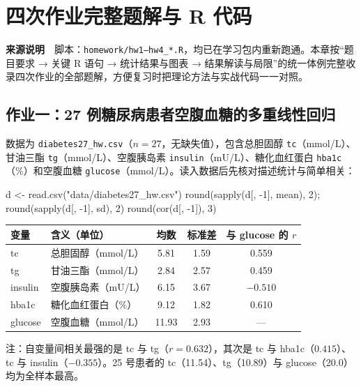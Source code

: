 \chapter{四次作业完整题解与 R 代码}

\begin{studysource}
\textbf{来源说明}　脚本：\texttt{homework/hw1–hw4\_*.R}，均已在学习包内重新跑通。本章按“题目要求 → 关键 R 语句 → 统计结果与图表 → 结果解读与局限”的统一体例完整收录四次作业的全部题解，方便复习时把理论方法与实战代码一一对照。
\end{studysource}


\section{作业一：27 例糖尿病患者空腹血糖的多重线性回归}

数据为 \texttt{diabetes27\_hw.csv}（$n=27$，无缺失值），包含总胆固醇 \texttt{tc}（mmol/L）、甘油三酯 \texttt{tg}（mmol/L）、空腹胰岛素 \texttt{insulin}（mU/L）、糖化血红蛋白 \texttt{hba1c}（\%）和空腹血糖 \texttt{glucose}（mmol/L）。读入数据后先核对描述统计与简单相关：

\begin{rcode}
d <- read.csv("data/diabetes27_hw.csv")
round(sapply(d[, -1], mean), 2); round(sapply(d[, -1], sd), 2)
round(cor(d[, -1]), 3)
\end{rcode}


\begin{tabular}{llccc}
\toprule
变量 & 含义（单位） & 均数 & 标准差 & 与 glucose 的 $r$\\
\midrule
tc      & 总胆固醇（mmol/L） & 5.81  & 1.59 & 0.559\\
tg      & 甘油三酯（mmol/L） & 2.84  & 2.57 & 0.459\\
insulin & 空腹胰岛素（mU/L） & 6.15  & 3.67 & $-0.510$\\
hba1c   & 糖化血红蛋白（\%） & 9.12  & 1.82 & 0.610\\
glucose & 空腹血糖（mmol/L） & 11.93 & 2.93 & ---\\
\bottomrule
\end{tabular}

\begin{studysource}
注：自变量间相关最强的是 tc 与 tg（$r=0.632$），其次是 tc 与 hba1c（$0.415$）、tc 与 insulin（$-0.355$）。25 号患者的 tc（11.54）、tg（10.89）与 glucose（20.0）均为全样本最高。
\end{studysource}


